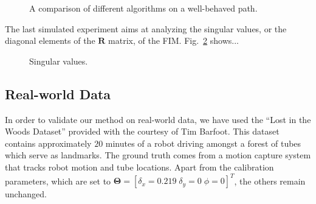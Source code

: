 
\begin{figure}[t]
\centering
{}
\caption{A comparison of different algorithms on a well-behaved path.}
\label{fig:loop_comp}
\end{figure}

The last simulated experiment aims at analyzing the singular values, or the
diagonal elements of the $\mathbf{R}$ matrix, of the FIM.
Fig.~\ref{fig:sing_values} shows...

\begin{figure}[t]
\centering
{}
\caption{Singular values.}
\label{fig:sing_values}
\end{figure}

\subsection{Real-world Data}

In order to validate our method on real-world data, we have used the ``Lost in
the Woods Dataset'' provided with the courtesy of Tim Barfoot. This dataset
contains approximately $20$ minutes of a robot driving amongst a forest of
tubes which serve as landmarks. The ground truth comes from a motion capture
system that tracks robot motion and tube locations. Apart from the calibration
parameters, which are set to $\mathbf{\Theta}=[\delta_x=0.219\;\delta_y=0\;
\phi=0]^T$, the others remain unchanged.
